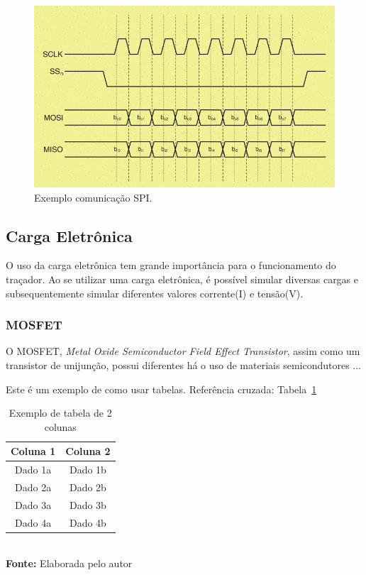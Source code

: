 \FloatBarrier
\begin{figure}[!htbp]
	\centering
	\includegraphics[scale=0.7]{imagens/SPI}
	\caption{Exemplo comunicação SPI. %
	}
	\label{fig:SPI}
\end{figure}
\FloatBarrier



\subsection{Carga Eletrônica}

O uso da carga eletrônica tem grande importância para o funcionamento do traçador. Ao se utilizar uma carga eletrônica, é possível simular diversas cargas e subsequentemente simular diferentes valores corrente(I) e tensão(V).

\subsubsection{MOSFET}

O MOSFET, \textit{Metal Oxide Semiconductor Field Effect Transistor}, assim como um transistor de unijunção, possui diferentes há o uso de materiais semicondutores ...

Este é um exemplo de como usar tabelas. Referência cruzada: Tabela~\ref{tab:exemplo}


\FloatBarrier
\begin{table}[!htbp]
\centering
\caption{Exemplo de tabela de 2 colunas}
	\begin{tabular}{ c | c }
		\hline
		\textbf{Coluna 1} & \textbf{Coluna 2} \\ \hline
		Dado 1a           & Dado 1b           \\ \hline
		Dado 2a           & Dado 2b           \\ \hline
		Dado 3a           & Dado 3b           \\ \hline
		Dado 4a           & Dado 4b           \\ \hline
	\end{tabular}
	\\ \vspace{0.2cm}
	\textbf{Fonte:} Elaborada pelo autor
	\label{tab:exemplo}
\end{table}
\FloatBarrier


